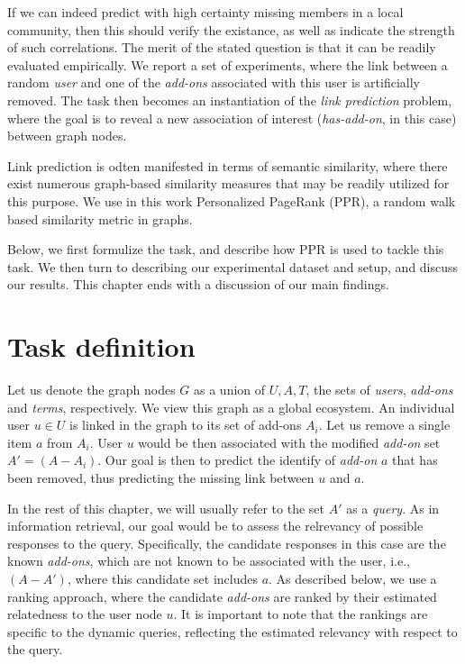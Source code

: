 \documentclass[11pt,oneside]{book}
\let\Oldsection\section
\renewcommand{\section}{\FloatBarrier\Oldsection}
\begin{document}
If we can indeed predict with high certainty missing members in a
local community, then this should verify the existance, as well as
indicate the strength of such correlations. The merit of the stated
question is that it can be readily evaluated empirically. We report a
set of experiments, where the link between a random {\it user} and one
of the {\it add-ons} associated with this user is artificially
removed. The task then becomes an instantiation of the {\it link
  prediction} problem, where the goal is to reveal a new association
of interest ({\it has-add-on}, in this case) between graph nodes.

Link prediction is odten manifested in terms of semantic similarity,
where there exist numerous graph-based similarity measures that may be
readily utilized for this purpose. We use in this work Personalized
PageRank (PPR), a random walk based similarity metric in graphs.

Below, we first formulize the task, and describe how PPR is used to
tackle this task. We then turn to describing our experimental dataset
and setup, and discuss our results. This chapter ends with a
discussion of our main findings.


\section{Task definition}
\label{sec:task}

Let us denote the graph nodes $G$ as a union of $U,A,T$, the sets of
{\it users}, {\it add-ons} and {\it terms}, respectively. We view this
graph as a global ecosystem. An individual user $u\in U$ is linked in
the graph to its set of add-ons $A_i$. Let us remove a single item $a$
from $A_i$. User $u$ would be then associated with the modified {\it
  add-on} set $A'=(A-A_i)$. Our goal is then to predict the identify
of {\it add-on} $a$ that has been removed, thus predicting the missing
link between $u$ and $a$.

In the rest of this chapter, we will usually refer to the set $A'$ as
a {\it query}. As in information retrieval, our goal would be to
assess the relrevancy of possible responses to the
query. Specifically, the candidate responses in this case are the
known {\it add-ons}, which are not known to be associated with the
user, i.e., $(A-A')$, where this candidate set includes $a$. As
described below, we use a ranking approach, where the candidate {\it
  add-ons} are ranked by their estimated relatedness to the user node
$u$. It is important to note that the rankings are specific to the
dynamic queries, reflecting the estimated relevancy with respect to
the query.
\end{document}
